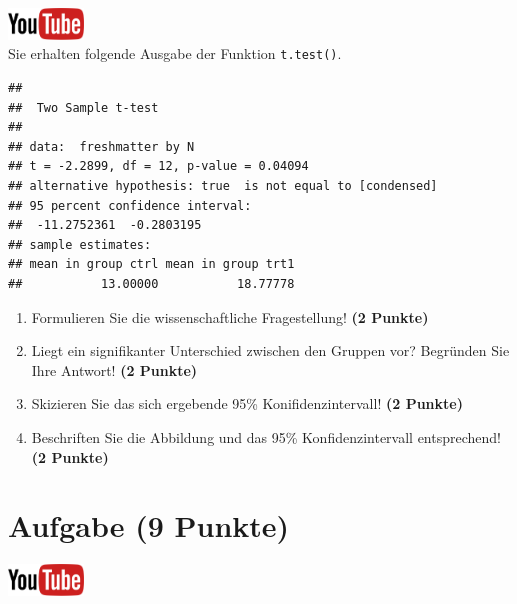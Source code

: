\documentclass[a4paper, 9pt]{scrartcl}\usepackage[]{graphicx}\usepackage[]{xcolor}
\makeatletter
\newenvironment{kframe}{%
 \def\at@end@of@kframe{}%
 \ifinner\ifhmode%
  \def\at@end@of@kframe{\end{minipage}}%
  \begin{minipage}{\columnwidth}%
 \fi\fi%
 \def\FrameCommand##1{\hskip\@totalleftmargin \hskip-\fboxsep
 \colorbox{shadecolor}{##1}\hskip-\fboxsep
     \hskip-\linewidth \hskip-\@totalleftmargin \hskip\columnwidth}%
 \MakeFramed {\advance\hsize-\width
   \@totalleftmargin\z@ \linewidth\hsize
   \@setminipage}}%
 {\par\unskip\endMakeFramed%
 \at@end@of@kframe}
\newenvironment{knitrout}{}{} %
\makeatother
\begin{document}
\hfill\href{https://youtu.be/wJqsNV1hOW8}{\includegraphics[width =
  2cm]{img/youtube}}\\[1Ex]

Sie erhalten folgende \Rlogo Ausgabe der Funktion \texttt{t.test()}.

\begin{knitrout}
\color{fgcolor}\begin{kframe}
\begin{verbatim}
## 
## 	Two Sample t-test
## 
## data:  freshmatter by N
## t = -2.2899, df = 12, p-value = 0.04094
## alternative hypothesis: true  is not equal to [condensed]
## 95 percent confidence interval:
##  -11.2752361  -0.2803195
## sample estimates:
## mean in group ctrl mean in group trt1 
##           13.00000           18.77778
\end{verbatim}
\end{kframe}
\end{knitrout}


\begin{enumerate}
  \item Formulieren Sie die wissenschaftliche Fragestellung! \textbf{(2
Punkte)}
\item Liegt ein signifikanter Unterschied zwischen den Gruppen vor?
  Begr{\"u}nden Sie Ihre Antwort! \textbf{(2 Punkte)}
\item Skizieren Sie das sich ergebende 95\% Konifidenzintervall! \textbf{(2 Punkte)}
\item Beschriften Sie die Abbildung und
  das 95\% Konfidenzintervall entsprechend! \textbf{(2 Punkte)}  
\end{enumerate} 
\clearpage

\section{Aufgabe \hfill (9 Punkte)}

\hfill\href{https://youtu.be/w62HJlbN28U}{\includegraphics[width =
  2cm]{img/youtube}}\\[1Ex]
\end{document}

